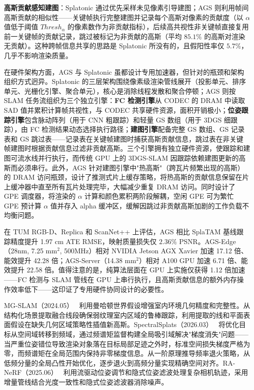 \textbf{高斯贡献感知建图}：Splatonic 通过优先采样未见像素引导建图；AGS 则利用帧间高斯贡献的相似性——关键帧执行完整建图并记录每个高斯对像素的贡献度（以 $\alpha$ 值低于阈值 $Thresh_\alpha$ 的像素数作为非贡献指标），后续高共视性非关键帧直接复用前一关键帧的贡献记录，跳过被标记为非贡献的高斯（平均 $85.1\%$ 的高斯对渲染无贡献）。这种跨帧信息共享的思路是 Splatonic 所没有的，且假阳性率仅 $5.7\%$，几乎不影响渲染质量。

在硬件架构方面，AGS 与 Splatonic 虽都设计专用加速器，但针对的瓶颈和架构组织方式迥异。Splatonic 的三层架构围绕像素级渲染管线展开（投影单元、排序单元、光栅化引擎、聚合单元），核心是消除线程发散和聚合停顿；AGS 则按 SLAM 任务流组织为三个独立引擎：\textbf{FC 检测引擎}从 CODEC 的 DRAM 中读取 SAD 值并累积计算帧共视性，与 CODEC 共享硬件资源，面积开销极小；\textbf{位姿跟踪引擎}包含脉动阵列（用于 CNN 粗跟踪）和轻量 GS 数组（用于 3DGS 细跟踪），由 FC 检测结果动态选择执行路径；\textbf{建图引擎}配备完整 GS 数组、GS 记录表和 GS 跳过表——记录表在关键帧建图时捕获高斯贡献信息，跳过表在非关键帧建图时根据贡献信息过滤非贡献高斯。三个引擎拥有独立硬件资源，使跟踪和建图可流水线并行执行，而传统 GPU 上的 3DGS-SLAM 因跟踪依赖建图更新的高斯而必须串行。此外，AGS 针对建图引擎中"热高斯"（跨瓦片频繁出现的高斯）的 DRAM 访问瓶颈，设计了推测式片上缓存策略，将热高斯的贡献信息保留在片上缓冲器中直至所有瓦片处理完毕，大幅减少重复 DRAM 访问。同时设计了 GPE 调度器，将渲染的 $\alpha$ 计算和颜色累积两阶段解耦，空闲 GPE 可为繁忙 GPE 预计算 $\alpha$ 值并存入 alpha 缓冲区，缓解因跳过非贡献高斯加剧的工作负载不均衡问题。

在 TUM RGB-D、Replica 和 ScanNet++ 上评估，AGS 相比 SplaTAM 基线跟踪精度提升 1.97 cm ATE RMSE，映射质量损失仅 $2.36\%$ PSNR。AGS-Edge（28nm, 7.25 mm$^2$, 500MHz）相对 NVIDIA Jetson AGX Xavier 加速 17.12 倍、能效提升 42.28 倍；AGS-Server（14.38 mm$^2$）相对 A100 GPU 加速 6.71 倍、能效提升 22.58 倍。值得注意的是，纯算法层面在 GPU 上实施仅获得 1.12 倍加速——FC 检测与 SLAM 管线在 GPU 上串行执行，且高斯贡献信息的额外内存操作效率低下——这印证了专用硬件协同设计的必要性。

MG-SLAM（2024.05）~\cite{2405_20031} 利用曼哈顿世界假设增强室内环境几何精度和完整性。从结构化场景提取融合线段确保弱纹理室内区域的鲁棒跟踪，利用提取的线和平面表面假设在缺失几何区域策略性插值新高斯。SpectralSplats（2026.03）~\cite{2603_24036} 将优化目标从空间域转移到频域，通过频谱矩监督构建全局吸引域解决"梯度消失"问题——当严重位姿错位导致渲染对象落在目标局部足迹之外时，标准空间损失梯度严格为零，而频谱矩在全局范围内保持非零梯度信息。从一阶原理推导频率退火策略，从低频分量的全局凸性开始优化，逐步退火到高频分量实现精确空间对齐。RA-NeRF（2025.06）~\cite{2506_15242} 利用流驱动位姿调节和隐式位姿滤波处理复杂相机轨迹，采用增量管线结合光度一致性和隐式位姿滤波器消除噪声。

